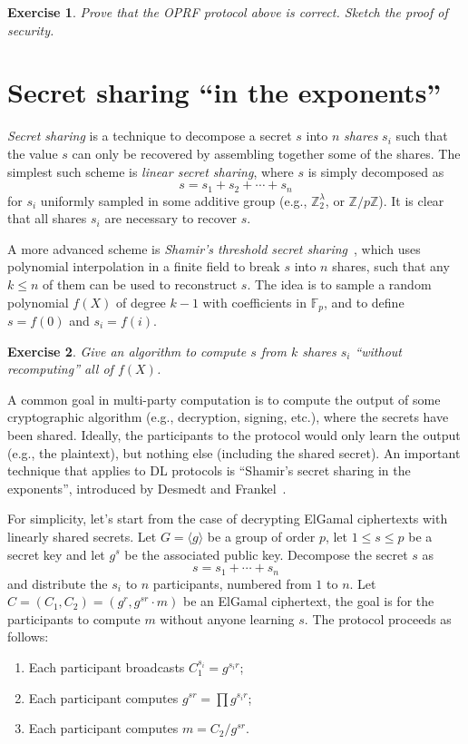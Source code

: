 \documentclass{article}
\newtheorem{ex}{Exercise}
\def\Z{\mathbb{Z}}
\def\F{\mathbb{F}}
\begin{document}
\begin{ex}
  Prove that the OPRF protocol above is correct.  Sketch the proof of
  security.
\end{ex}


\section{Secret sharing ``in the exponents''}

\emph{Secret sharing} is a technique to decompose a secret $s$ into
$n$ \emph{shares} $s_i$ such that the value $s$ can only be recovered
by assembling together some of the shares.  The simplest such scheme
is \emph{linear secret sharing}, where $s$ is simply decomposed as
\[s = s_1 + s_2 + \cdots + s_n\] for $s_i$ uniformly sampled in some
additive group (e.g., $\Z_2^\lambda$, or $\Z/p\Z$).  It is clear that
all shares $s_i$ are necessary to recover $s$.

A more advanced scheme is \emph{Shamir's threshold secret
  sharing}~\cite{Shamir79}, which uses polynomial interpolation in a
finite field to break $s$ into $n$ shares, such that any $k \le n$ of
them can be used to reconstruct $s$.  The idea is to sample a random
polynomial $f(X)$ of degree $k-1$ with coefficients in $\F_p$, and to
define $s=f(0)$ and $s_i = f(i)$.

\begin{ex}
  Give an algorithm to compute $s$ from $k$ shares $s_i$ ``without
  recomputing'' all of $f(X)$.
\end{ex}

A common goal in multi-party computation is to compute the output of
some cryptographic algorithm (e.g., decryption, signing, etc.), where
the secrets have been shared.  Ideally, the participants to the
protocol would only learn the output (e.g., the plaintext), but
nothing else (including the shared secret).  An important technique
that applies to DL protocols is ``Shamir's secret sharing in the
exponents'', introduced by Desmedt and Frankel~\cite{C:DesFra89}.

For simplicity, let's start from the case of decrypting ElGamal
ciphertexts with linearly shared secrets.  Let $G=\langle g\rangle$ be
a group of order $p$, let $1\le s\le p$ be a secret key and let $g^s$
be the associated public key.  Decompose the secret $s$ as
\[s = s_1 + \cdots + s_n\] and distribute the $s_i$ to $n$
participants, numbered from $1$ to $n$.  Let
$C = (C_1, C_2) = (g^r, g^{sr} \cdot m)$ be an ElGamal ciphertext, the
goal is for the participants to compute $m$ without anyone learning
$s$.  The protocol proceeds as follows:
\begin{enumerate}
\item Each participant broadcasts $C_1^{s_i} = g^{s_i r}$;
\item Each participant computes $g^{sr} = \prod g^{s_i r}$;
\item Each participant computes $m = C_2 / g^{sr}$.
\end{enumerate}
\end{document}
